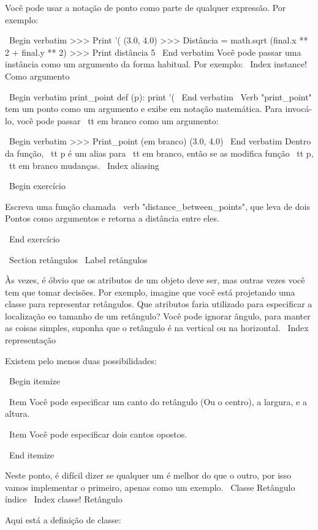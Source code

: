 \documentclass[10pt]{book}
\begin{document}
\begin {itemize}
{{{{{{{{{{{{Você pode usar a notação de ponto como parte de qualquer expressão. Por exemplo:

\ Begin {verbatim}
>>> Print '(%
(3.0, 4.0)
>>> Distância = math.sqrt (final.x ** 2 + final.y ** 2)
>>> Print distância
5
\ End {verbatim}
%
Você pode passar uma instância como um argumento da forma habitual.
Por exemplo:
\ Index {instance! Como argumento}

\ Begin {verbatim}
print_point def (p):
    print '(%
\ End {verbatim}
%
\ Verb "print_point" tem um ponto como um argumento e exibe em
notação matemática. Para invocá-lo, você pode passar {\ tt em branco} como
um argumento:

\ Begin {verbatim}
>>> Print_point (em branco)
(3.0, 4.0)
\ End {verbatim}
%
Dentro da função, {\ tt p} é um alias para {\ tt em branco}, então se
as modifica função {\ tt p}, {\ tt em branco} mudanças.
\ Index {aliasing}


\ Begin {} exercício

Escreva uma função chamada \ verb "distance_between_points", que leva de dois
Pontos como argumentos e retorna a distância entre eles.

\ End {} exercício



\ Section {} retângulos
\ Label {} retângulos

Às vezes, é óbvio que os atributos de um objeto deve ser,
mas outras vezes você tem que tomar decisões. Por exemplo, imagine que você
está projetando uma classe para representar retângulos. Que atributos faria
utilizado para especificar a localização eo tamanho de um retângulo? Você pode
ignorar ângulo, para manter as coisas simples, suponha que o retângulo é
na vertical ou na horizontal.
\ Index {representação}

Existem pelo menos duas possibilidades: 

\ Begin {itemize}

\ Item Você pode especificar um canto do retângulo
(Ou o centro), a largura, e a altura.

\ Item Você pode especificar dois cantos opostos.

\ End {itemize}

Neste ponto, é difícil dizer se qualquer um é melhor do que
o outro, por isso vamos implementar o primeiro, apenas como um exemplo.
\ {Classe Retângulo} índice
\ Index {classe! Retângulo}

Aqui está a definição de classe:

}}}}}}}}}}}}
\end{itemize}
\end{document}
